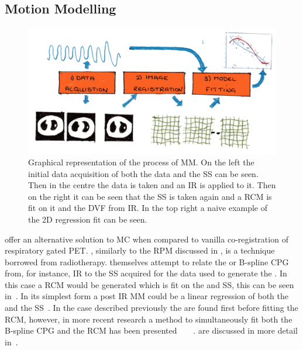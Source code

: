         \subsection{Motion Modelling} \label{sec:motion_modelling}
            \begin{figure}
                \centering
                        
                \includegraphics[width=1.0\linewidth]{figures/background_motion_model.png}
                        
                \captionsetup{singlelinecheck=false, justification=raggedright}
                \caption{Graphical representation of the process of \gls{MM}. On the left the initial data acquisition of both the data and the \gls{SS} can be seen. Then in the centre the data is taken and an \gls{IR} is applied to it. Then on the right it can be seen that the \gls{SS} is taken again and a \gls{RCM} is fit on it and the \gls{DVF} from \gls{IR}. In the top right a naive example of the \gls{2D} regression fit can be seen.} \label{fig:motion_modelling_motion_model}
            \end{figure}
            
             offer an alternative solution to \gls{MC} when compared to vanilla co-registration of respiratory gated \gls{PET}. , similarly to the \gls{RPM} discussed in , is a technique borrowed from radiotherapy.  themselves attempt to relate the  or B-spline \gls{CPG} from, for instance, \gls{IR} to the \gls{SS} acquired for the data used to generate the . In this case a \gls*{RCM} would be generated which is fit on the  and \gls{SS}, this can be seen in~. In its simplest form a post \gls{IR} \gls{MM} could be a linear regression of both the  and the \gls{SS}~. In the case described previously the  are found first before fitting the \gls{RCM}, however, in more recent research a method to simultaneously fit both the B-spline \gls{CPG} and the \gls{RCM} has been presented~~~~.  are discussed in more detail in~.
            
